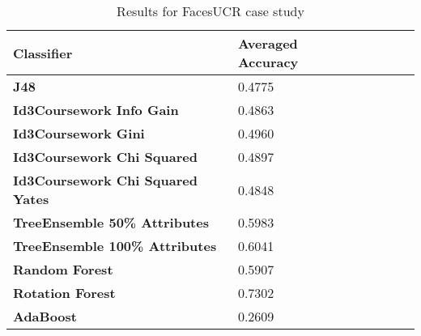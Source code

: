 \documentclass{cmppgr}
\begin{document}
\begin{table}[!h]
  \centering
  \scriptsize
  \caption{Results for FacesUCR case study}
  \begin{tabular}{|p{4cm}|p{2cm}|p{2cm}| p{2cm} |p{2cm}| p{2cm}|}
  \hline \bf Classifier & \bf Averaged Accuracy \\ [10pt]

  \hline \bf J48 & 0.4775 \\ [10pt]
  \hline \bf Id3Coursework Info Gain & 0.4863 \\ [10pt]
  \hline \bf Id3Coursework Gini & 0.4960 \\ [10pt]
  \hline \bf Id3Coursework Chi Squared & 0.4897 \\ [10pt]
  \hline \bf Id3Coursework Chi Squared Yates & 0.4848 \\ [10pt]
  \hline \bf TreeEnsemble 50\% Attributes & 0.5983 \\ [10pt]
  \hline \bf TreeEnsemble 100\% Attributes & 0.6041 \\ [10pt]
  \hline \bf Random Forest & 0.5907 \\ [10pt]
  \hline \bf Rotation Forest & 0.7302 \\ [10pt]
  \hline \bf AdaBoost & 0.2609 \\ [10pt]
  \hline
  \end{tabular} \\
\end{table}
\end{document}
